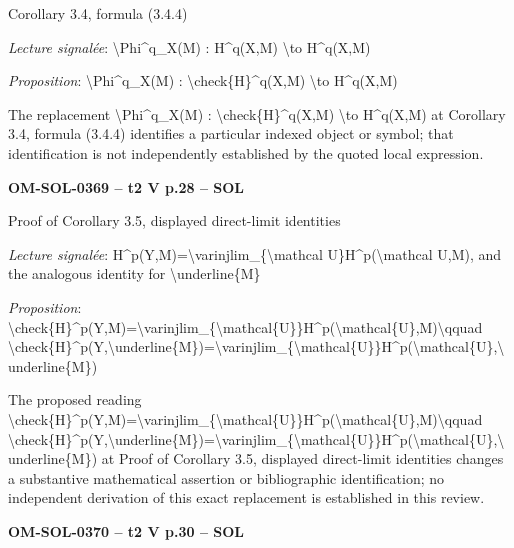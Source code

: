 Corollary 3.4, formula (3.4.4)\par
\emph{Lecture signalée}: \textbackslash{}Phi\textasciicircum{}q\_X(M) : H\textasciicircum{}q(X,M) \textbackslash{}to H\textasciicircum{}q(X,M)\par
\emph{Proposition}: \textbackslash{}Phi\textasciicircum{}q\_X(M) : \textbackslash{}check\{H\}\textasciicircum{}q(X,M) \textbackslash{}to H\textasciicircum{}q(X,M)\par
The replacement \textbackslash{}Phi\textasciicircum{}q\_X(M) : \textbackslash{}check\{H\}\textasciicircum{}q(X,M) \textbackslash{}to H\textasciicircum{}q(X,M) at Corollary 3.4, formula (3.4.4) identifies a particular indexed object or symbol; that identification is not independently established by the quoted local expression.\par
\par\noindent\textbf{OM-SOL-0369 -- t2 V p.28 -- SOL}\par
Proof of Corollary 3.5, displayed direct-limit identities\par
\emph{Lecture signalée}: H\textasciicircum{}p(Y,M)=\allowbreak \textbackslash{}varinjlim\_\{\textbackslash{}mathcal U\}H\textasciicircum{}p(\textbackslash{}mathcal U,M), and the analogous identity for \textbackslash{}underline\{M\}\par
\emph{Proposition}: \textbackslash{}check\{H\}\textasciicircum{}p(Y,M)=\allowbreak \textbackslash{}varinjlim\_\{\textbackslash{}mathcal\{U\}\}H\textasciicircum{}p(\textbackslash{}mathcal\{U\},M)\textbackslash{}qquad \textbackslash{}check\{H\}\textasciicircum{}p(Y,\textbackslash{}underline\{M\})=\allowbreak \textbackslash{}varinjlim\_\{\textbackslash{}mathcal\{U\}\}H\textasciicircum{}p(\textbackslash{}mathcal\{U\},\textbackslash{}underline\{M\})\par
The proposed reading \textbackslash{}check\{H\}\textasciicircum{}p(Y,M)=\allowbreak \textbackslash{}varinjlim\_\{\textbackslash{}mathcal\{U\}\}H\textasciicircum{}p(\textbackslash{}mathcal\{U\},M)\textbackslash{}qquad \textbackslash{}check\{H\}\textasciicircum{}p(Y,\textbackslash{}underline\{M\})=\allowbreak \textbackslash{}varinjlim\_\{\textbackslash{}mathcal\{U\}\}H\textasciicircum{}p(\textbackslash{}mathcal\{U\},\textbackslash{}underline\{M\}) at Proof of Corollary 3.5, displayed direct-limit identities changes a substantive mathematical assertion or bibliographic identification; no independent derivation of this exact replacement is established in this review.\par
\par\noindent\textbf{OM-SOL-0370 -- t2 V p.30 -- SOL}\par

